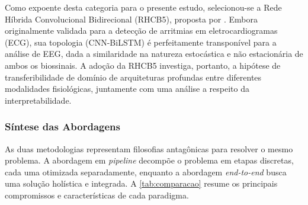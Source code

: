 \documentclass[alpha-refs,brazilian]{CC-EC_TF-TC}
\begin{document}
Como expoente desta categoria para o presente estudo, selecionou-se a Rede Híbrida Convolucional Bidirecional (RHCB5), proposta por \cite{Maggioni2023, Maggioni2024}. Embora originalmente validada para a detecção de arritmias em eletrocardiogramas (ECG), sua topologia (CNN-BiLSTM) é perfeitamente transponível para a análise de EEG, dada a similaridade na natureza estocástica e não estacionária de ambos os biossinais. A adoção da RHCB5 investiga, portanto, a hipótese de transferibilidade de domínio de arquiteturas profundas entre diferentes modalidades fisiológicas, juntamente com uma análise a respeito da interpretabilidade.

\subsubsection{Síntese das Abordagens}

As duas metodologias representam filosofias antagônicas para resolver o mesmo problema. A abordagem em \textit{pipeline} decompõe o problema em etapas discretas, cada uma otimizada separadamente, enquanto a abordagem \textit{end-to-end} busca uma solução holística e integrada. A \autoref{tab:comparacao} resume os principais compromissos e características de cada paradigma.
\end{document}
